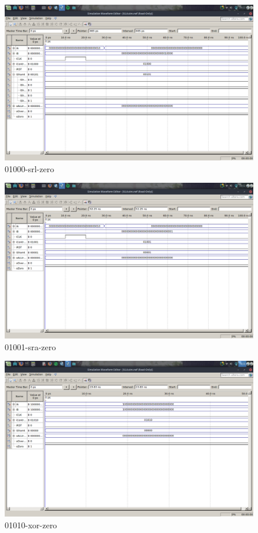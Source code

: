 \documentclass[12pt]{article}
\begin{document}
\begin{figure}[H]
	\centering
	\includegraphics[width=.8\textwidth]{01000-srl-zero.png}
	\caption{01000-srl-zero}
	\label{fig:01000-srl-zero}
\end{figure}

\begin{figure}[H]
	\centering
	\includegraphics[width=.8\textwidth]{01001-sra-zero.png}
	\caption{01001-sra-zero}
	\label{fig:01001-sra-zero}
\end{figure}

\begin{figure}[H]
	\centering
	\includegraphics[width=.8\textwidth]{01010-xor-zero.png}
	\caption{01010-xor-zero}
	\label{fig:01010-xor-zero}
\end{figure}
\end{document}
